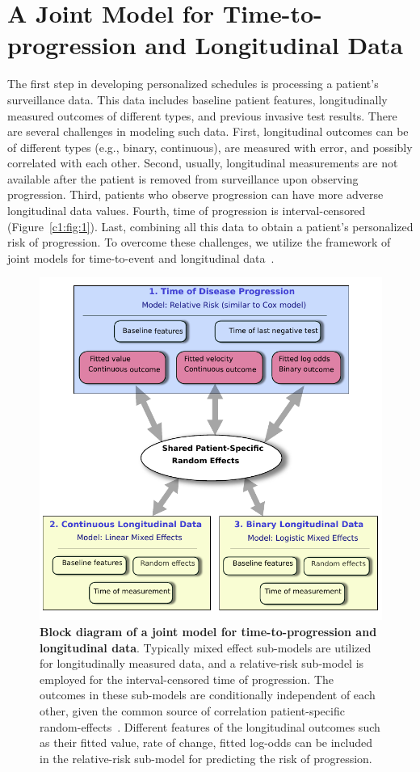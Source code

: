 \section{A Joint Model for Time-to-progression and Longitudinal Data}
\label{c1:sec:jm}
The first step in developing personalized schedules is processing a patient's surveillance data. This data includes baseline patient features, longitudinally measured outcomes of different types, and previous invasive test results. There are several challenges in modeling such data. First, longitudinal outcomes can be of different types (e.g., binary, continuous), are measured with error, and possibly correlated with each other. Second, usually, longitudinal measurements are not available after the patient is removed from surveillance upon observing progression. Third, patients who observe progression can have more adverse longitudinal data values. Fourth, time of progression is interval-censored (Figure~\ref{c1:fig:1}). Last, combining all this data to obtain a patient's personalized risk of progression. To overcome these challenges, we utilize the framework of joint models for time-to-event and longitudinal data~\citep{rizopoulos2012joint, tsiatis2004joint}.

\begin{figure}[tbp]
\includegraphics{contents/c1/images/c1_jm_blockdiag.pdf}
\caption{\textbf{Block diagram of a joint model for time-to-progression and longitudinal data}. Typically mixed effect sub-models are utilized for longitudinally measured data, and a relative-risk sub-model is employed for the interval-censored time of progression. The outcomes in these sub-models are conditionally independent of each other, given the common source of correlation patient-specific random-effects~\citep{laird1982random}. Different features of the longitudinal outcomes such as their fitted value, rate of change, fitted log-odds can be included in the relative-risk sub-model for predicting the risk of progression.} 
\label{c1:fig:c1_jm_blockdiag}
\end{figure}

